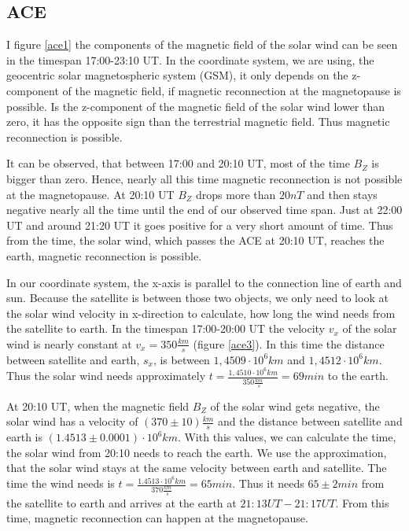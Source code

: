 \documentclass[10pt,a4paper]{article}
\begin{document}
\subsection{ACE}

I figure \ref{ace1} the components of the magnetic field of the solar wind can be seen in the timespan 17:00-23:10 UT. In the coordinate system, we are using, the geocentric solar magnetospheric system (GSM), it only depends on the z-component of the magnetic field, if magnetic reconnection at the magnetopause is possible. Is the z-component of the magnetic field of the solar wind lower than zero, it has the opposite sign than the terrestrial magnetic field. Thus magnetic reconnection is possible. 

It can be observed, that between 17:00 and 20:10 UT, most of the time $B_Z$ is bigger than zero. Hence, nearly all this time magnetic reconnection is not possible at the magnetopause.
At 20:10 UT $B_Z$ drops more than $20 nT$ and then stays negative nearly all the time until the end of our observed time span. Just at 22:00 UT and around 21:20 UT it goes positive for a very short amount of time. Thus from the time, the solar wind, which passes the ACE at 20:10 UT, reaches the earth, magnetic reconnection is possible. 

In our coordinate system, the x-axis is parallel to the connection line of earth and sun. Because the satellite is between those two objects, we only need to look at the solar wind velocity in x-direction to calculate, how long the wind needs from the satellite to earth.
In the timespan 17:00-20:00 UT the velocity $v_x$ of the solar wind is nearly constant at $v_x = 350 \frac{km}{s}$ (figure \ref{ace3}). In this time the distance between satellite and earth, $s_x$, is between $1,4509 \cdot 10^6 km$ and $1,4512 \cdot 10^6 km$. Thus the solar wind needs approximately $t = \frac{1,4510 \cdot 10^6 km}{350 \frac{km}{s}} = 69 min$ to the earth.

At 20:10 UT, when the magnetic field $B_Z$ of the solar wind gets negative, the solar wind has a velocity of $(370 \pm 10) \frac{km}{s}$ and the distance between satellite and earth is $(1.4513 \pm 0.0001) \cdot 10^6 km$. With this values, we can calculate the time, the solar wind from 20:10 needs to reach the earth. We use the approximation, that the solar wind stays at the same velocity between earth and satellite. The time the wind needs is $t = \frac{1.4513 \cdot 10^6 km}{370 \frac{km}{s}} = 65 min$. Thus it needs $65 \pm 2 min$ from the satellite to earth and arrives at the earth at $21:13 UT - 21:17 UT$. From this time, magnetic reconnection can happen at the magnetopause.
\end{document}
